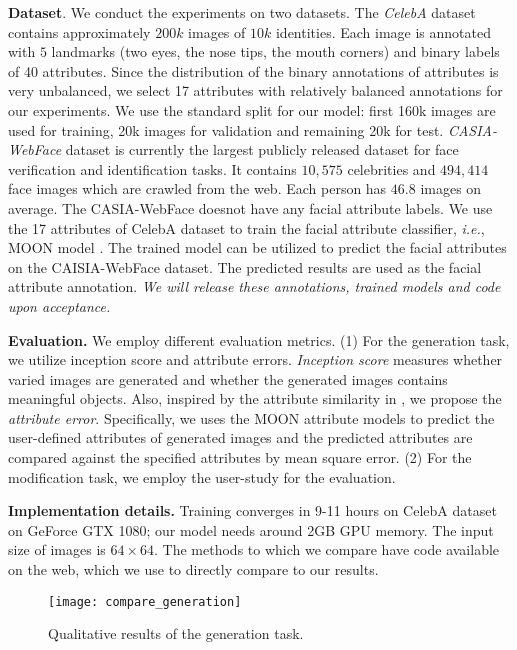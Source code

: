 \documentclass[10pt,letterpaper,twocolumn]{article}
\begin{document}
\noindent \textbf{Dataset}. We conduct the experiments on two datasets.
The \emph{CelebA} dataset \cite{liu2015deep} contains approximately
$200k$ images of $10k$ identities. Each image is annotated with
$5$ landmarks (two eyes, the nose tips, the mouth corners) and binary
labels of 40 attributes. Since the distribution of the binary annotations
of attributes is very unbalanced, we select 17 attributes with relatively
balanced annotations for our experiments. We use the standard split
for our model: first 160k images are used for training, 20k images
for validation and remaining 20k for test. \emph{CASIA-WebFace} dataset
is currently the largest publicly released dataset for face verification
and identification tasks. It contains $10,575$ celebrities and $494,414$
face images which are crawled from the web. Each person has $46.8$
images on average. The CASIA-WebFace \cite{yi2014learning} doesnot
have any facial attribute labels. We use the 17 attributes of CelebA
dataset \cite{liu2015deep} to train the facial attribute classifier,
\emph{i.e.}, MOON model \cite{moon_attrb}. The trained model can
be utilized to predict the facial attributes on the CAISIA-WebFace
dataset. The predicted results are used as the facial attribute annotation.
{\em We will release these annotations, trained models and code
upon acceptance.}

\vspace{0.07in}
\noindent \textbf{Evaluation. }We employ different evaluation metrics. (1) For
the generation task, we utilize inception score and attribute errors.
\emph{Inception score} \cite{tim2016nips} measures whether varied
images are generated and whether the generated images contains meaningful
objects. Also, inspired by the attribute similarity in \cite{yan2016eccv},
we propose the \emph{attribute error}. Specifically, we uses the MOON
attribute \cite{moon_attrb} models to predict the user-defined attributes
of generated images and the predicted attributes are compared against
the specified attributes by mean square error. (2) For the modification
task, we employ the user-study for the evaluation.

\vspace{0.07in}
\noindent \textbf{Implementation details.} Training converges in 9-11 hours
on CelebA dataset on GeForce GTX 1080; our model needs around 2GB
GPU memory. The input size of images is $64\times64$. The methods
to which we compare have code available on the web, which we use to
directly compare to our results. 

\noindent 
\begin{figure}
\begin{centering}
\texttt{[image: compare\_generation]} 
\par\end{centering}
\caption{\label{fig:Qualitative-results-of}Qualitative results of the generation
task. }
\end{figure}
\end{document}
